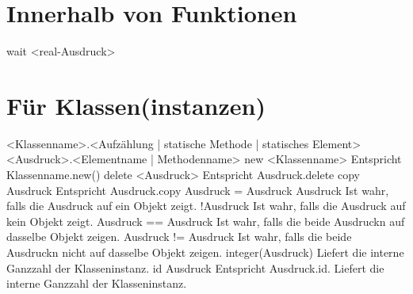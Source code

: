 \section{Innerhalb von Funktionen}
wait <real-Ausdruck>

\section{Für Klassen(instanzen)}
<Klassenname>.<Aufzählung | statische Methode | statisches Element>
<Ausdruck>.<Elementname | Methodenname>
new <Klassenname>				Entspricht Klassenname.new()
delete <Ausdruck>				Entspricht Ausdruck.delete
copy Ausdruck					Entspricht Ausdruck.copy
Ausdruck = Ausdruck
Ausdruck					Ist wahr, falls die Ausdruck auf ein Objekt zeigt.
!Ausdruck					Ist wahr, falls die Ausdruck auf kein Objekt zeigt.
Ausdruck == Ausdruck				Ist wahr, falls die beide Ausdruckn auf dasselbe Objekt zeigen.
Ausdruck != Ausdruck				Ist wahr, falls die beide Ausdruckn nicht auf dasselbe Objekt zeigen.
integer(Ausdruck)				Liefert die interne Ganzzahl der Klasseninstanz.
id Ausdruck					Entspricht Ausdruck.id. Liefert die interne Ganzzahl der Klasseninstanz.
